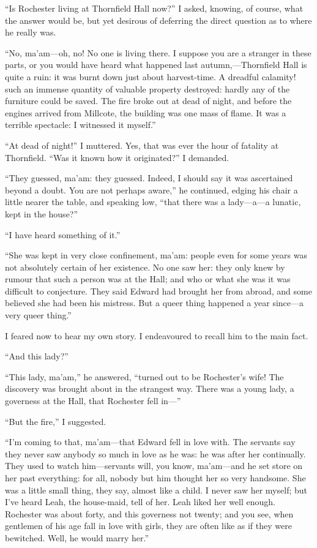 \enquote{Is \Mr{} Rochester living at Thornfield Hall now?} I asked,
knowing, of course, what the answer would be, but yet desirous of
deferring the direct question as to where he really was.

\enquote{No, ma'am---oh, no! No one is living there. I suppose you are
	a stranger in these parts, or you would have heard what happened last
	autumn,---Thornfield Hall is quite a ruin: it was burnt down just about
	harvest-time. A dreadful calamity! such an immense quantity of valuable
	property destroyed: hardly any of the furniture could be saved. The
	fire broke out at dead of night, and before the engines arrived from
	Millcote, the building was one mass of flame. It was a terrible
	spectacle: I witnessed it myself.}

\enquote{At dead of night!} I muttered. Yes, that was ever the hour of
fatality at Thornfield. \enquote{Was it known how it originated?} I
demanded.

\enquote{They guessed, ma'am: they guessed. Indeed, I should say it was
	ascertained beyond a doubt. You are not perhaps aware,} he continued,
edging his chair a little nearer the table, and speaking low,
\enquote{that there was a lady---a---a lunatic, kept in the house?}

\enquote{I have heard something of it.}

\enquote{She was kept in very close confinement, ma'am: people even for
	some years was not absolutely certain of her existence. No one saw her:
	they only knew by rumour that such a person was at the Hall; and who or
	what she was it was difficult to conjecture. They said \Mr{} Edward had
	brought her from abroad, and some believed she had been his mistress.
	But a queer thing happened a year since---a very queer thing.}

I feared now to hear my own story. I endeavoured to recall him to the
main fact.

\enquote{And this lady?}

\enquote{This lady, ma'am,} he answered, \enquote{turned out to be \Mr{}
	Rochester's wife! The discovery was brought about in the strangest
	way. There was a young lady, a governess at the Hall, that \Mr{}
	Rochester fell in---}

\enquote{But the fire,} I suggested.

\enquote{I'm coming to that, ma'am---that \Mr{} Edward fell in love with.
	The servants say they never saw anybody so much in love as he was: he
	was after her continually. They used to watch him---servants will, you
	know, ma'am---and he set store on her past everything: for all, nobody
	but him thought her so very handsome. She was a little small thing,
	they say, almost like a child. I never saw her myself; but I've heard
	Leah, the house-maid, tell of her. Leah liked her well enough. \Mr{}
	Rochester was about forty, and this governess not twenty; and you see,
	when gentlemen of his age fall in love with girls, they are often like
	as if they were bewitched. Well, he would marry her.}

